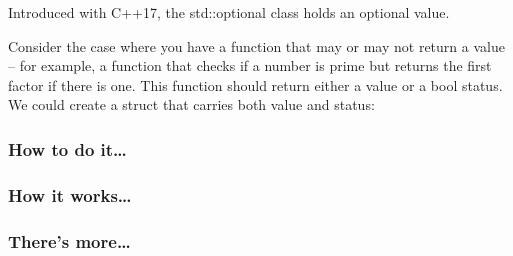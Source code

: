 
Introduced with C++17, the std::optional class holds an optional value.

Consider the case where you have a function that may or may not return a value – for example, a function that checks if a number is prime but returns the first factor if there is one. This function should return either a value or a bool status. We could create a struct that carries both value and status:


\subsubsection{How to do it…}


\subsubsection{How it works…}

\subsubsection{There's more…}


